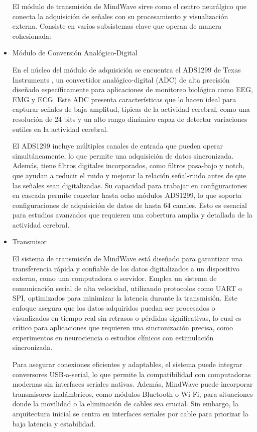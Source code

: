 \begin{itemize}
El módulo de transmisión de MindWave sirve como el centro neurálgico que conecta la adquisición de señales con su procesamiento y visualización externa. Consiste en varios subsistemas clave que operan de manera cohesionada:

    \item Módulo de Conversión Analógico-Digital

En el núcleo del módulo de adquisición se encuentra el ADS1299 de Texas Instruments \cite{TI_ADS1299}, un convertidor analógico-digital (ADC) de alta precisión diseñado específicamente para aplicaciones de monitoreo biológico como EEG, EMG y ECG. Este ADC presenta características que lo hacen ideal para capturar señales de baja amplitud, típicas de la actividad cerebral, como una resolución de 24 bits y un alto rango dinámico capaz de detectar variaciones sutiles en la actividad cerebral.

El ADS1299 incluye múltiples canales de entrada que pueden operar simultáneamente, lo que permite una adquisición de datos sincronizada. Además, tiene filtros digitales incorporados, como filtros pasa-bajo y notch, que ayudan a reducir el ruido y mejorar la relación señal-ruido antes de que las señales sean digitalizadas. Su capacidad para trabajar en configuraciones en cascada permite conectar hasta ocho módulos ADS1299, lo que soporta configuraciones de adquisición de datos de hasta 64 canales. Esto es esencial para estudios avanzados que requieren una cobertura amplia y detallada de la actividad cerebral.

    \item Transmisor

El sistema de transmisión de MindWave está diseñado para garantizar una transferencia rápida y confiable de los datos digitalizados a un dispositivo externo, como una computadora o servidor. Emplea un sistema de comunicación serial de alta velocidad, utilizando protocolos como UART o SPI, optimizados para minimizar la latencia durante la transmisión. Este enfoque asegura que los datos adquiridos puedan ser procesados o visualizados en tiempo real sin retrasos o pérdidas significativas, lo cual es crítico para aplicaciones que requieren una sincronización precisa, como experimentos en neurociencia o estudios clínicos con estimulación sincronizada.

Para asegurar conexiones eficientes y adaptables, el sistema puede integrar conversores USB-a-serial, lo que permite la compatibilidad con computadoras modernas sin interfaces seriales nativas. Además, MindWave puede incorporar transmisores inalámbricos, como módulos Bluetooth o Wi-Fi, para situaciones donde la movilidad o la eliminación de cables sea crucial. Sin embargo, la arquitectura inicial se centra en interfaces seriales por cable para priorizar la baja latencia y estabilidad.


\end{itemize}
